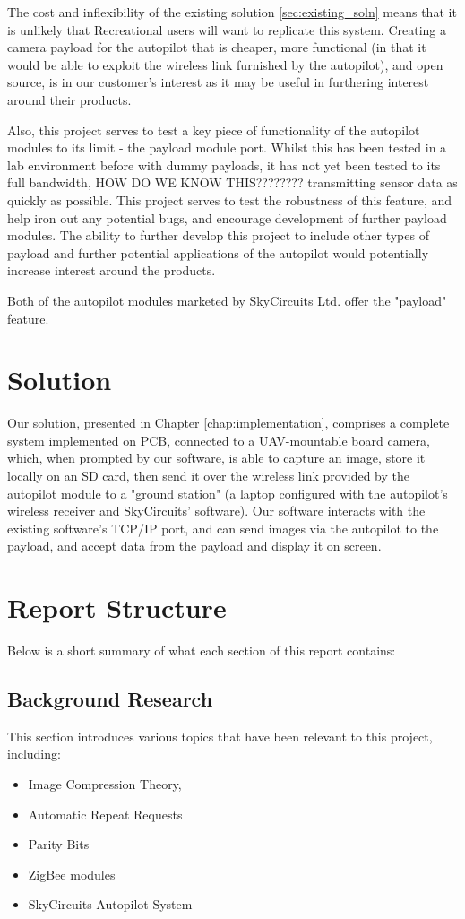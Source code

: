 The cost and inflexibility of the existing solution \ref{sec:existing_soln} 
means that it is unlikely that Recreational users will want to replicate 
this system. Creating a camera payload for the autopilot that is cheaper, 
more functional (in that it would be able to exploit the wireless link 
furnished by the autopilot), and open source, is in our customer's interest 
as it may be useful in furthering interest around their products.

Also, this project serves to test a key piece of functionality of the 
autopilot modules to its limit - the payload module port. Whilst this has 
been tested in a lab environment before with dummy payloads, it has not 
yet been tested to its full bandwidth, HOW DO WE KNOW THIS???????? transmitting sensor data as quickly 
as possible. This project serves to test the robustness of this feature, 
and help iron out any potential bugs, and encourage development of further 
payload modules. The ability to further develop this project to include 
other types of payload and further potential applications of the autopilot 
would potentially increase interest around the products.

Both of the autopilot modules marketed by SkyCircuits Ltd. offer the "payload" 
feature.

\section{Solution}

Our solution, presented in Chapter \ref{chap:implementation}, comprises a complete system implemented on PCB, connected to a UAV-mountable board camera, which, 
when prompted by our software, is able to capture an image, store it locally 
on an SD card, then send it over the wireless link provided by the autopilot 
module to a "ground station" (a laptop configured with the autopilot's 
wireless receiver and SkyCircuits' software). Our software interacts with 
the existing software's TCP/IP port, and can send images via the autopilot 
to the payload, and accept data from the payload and display it on screen.

\section{Report Structure}

Below is a short summary of what each section of this report contains:

\subsection{Background Research}
This section introduces various topics that have been relevant to this 
project, including:
\begin{itemize}
\item Image Compression Theory, 
\item Automatic Repeat Requests
\item Parity Bits
\item ZigBee modules
\item SkyCircuits Autopilot System
\end{itemize}

